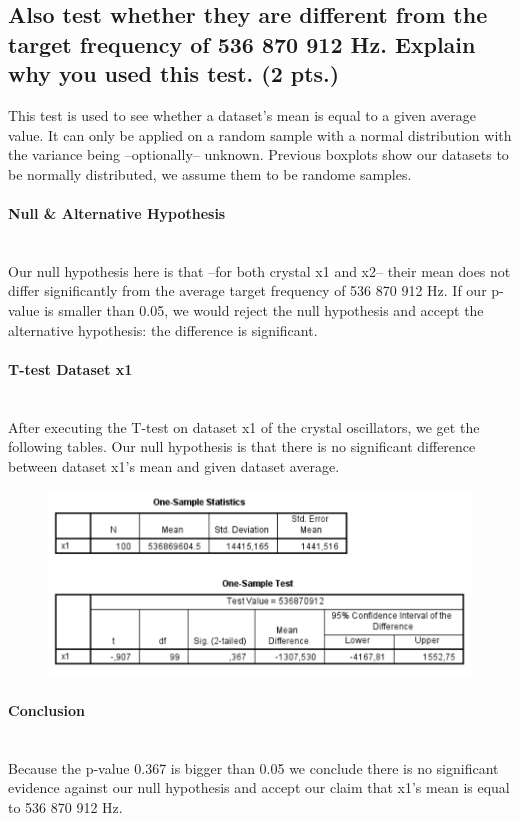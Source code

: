 \documentclass[14]{article}
\begin{document}
\subsection{Also test whether they are different from the target frequency of 536 870 912 Hz. Explain why you used this test. (2 pts.)}
This test is used to see whether a dataset's mean is equal to a given average value. It can only be applied on a random sample with a normal distribution with the variance being --optionally-- unknown. Previous boxplots show our datasets to be normally distributed, we assume them to be randome samples.

\paragraph{Null \& Alternative Hypothesis}\mbox{}\\
Our null hypothesis here is that --for both crystal x1 and x2-- their mean does not differ significantly from the average target frequency of 536 870 912 Hz. If our p-value is smaller than 0.05, we would reject the null hypothesis and accept the alternative hypothesis: the difference is significant.

\paragraph{T-test Dataset x1}\mbox{}\\
After executing the T-test on dataset x1 of the crystal oscillators, we get the following tables. Our null hypothesis is that there is no significant difference between dataset x1's mean and given dataset average.

\begin{figure}[!htb]
	\includegraphics[width=1.0\textwidth]{img/question1/question1_x1_T.PNG}
	\captionsetup{width=1.0\textwidth}
	\centering 
\end{figure}

\paragraph{Conclusion}\mbox{}\\
Because the p-value 0.367 is bigger than 0.05 we conclude there is no significant evidence against our null hypothesis and accept our claim that x1's mean is equal to 536 870 912 Hz.
\end{document}
